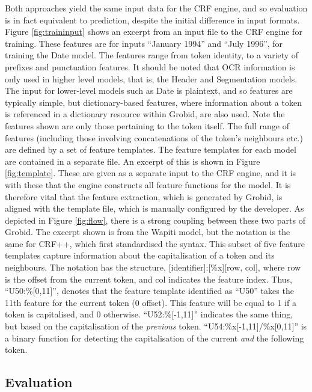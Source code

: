 Both approaches yield the same input data for the CRF engine, and so evaluation is in fact equivalent to prediction, despite the initial difference in input formats. Figure \ref{fig:traininput} shows an excerpt from an input file to the CRF engine for training. These features are for inputs ``January 1994'' and ``July 1996'', for training the Date model. The features range from token identity, to a variety of prefixes and punctuation features. It should be noted that OCR information is only used in higher level models, that is, the Header and Segmentation models. The input for lower-level models such as Date is plaintext, and so features are typically simple, but dictionary-based features, where information about a token is referenced in a dictionary resource within Grobid, are also used. Note the features shown are only those pertaining to the token itself. The full range of features (including those involving concatenations of the token's neighbours etc.) are defined by a set of feature templates. The feature templates for each model are contained in a separate file. An excerpt of this is shown in Figure \ref{fig:template}. These are given as a separate input to the CRF engine, and it is with these that the engine constructs all feature functions for the model. It is therefore vital that the feature extraction, which is generated by Grobid, is aligned with the template file, which is manually configured by the developer. As depicted in Figure \ref{fig:flow}, there is a strong coupling between these two parts of Grobid. The excerpt shown is from the Wapiti model, but the notation is the same for CRF++, which first standardised the syntax. This subset of five feature templates capture information about the capitalisation of a token and its neighbours. The notation has the structure, [identifier]:[\%x][row, col], where row is the offset from the current token, and col indicates the feature index. Thus, ``U50:\%[0,11]'', denotes that the feature template identified as ``U50'' takes the 11th feature for the current token (0 offset). This feature will be equal to 1 if a token is capitalised, and 0 otherwise. ``U52:\%[-1,11]'' indicates the same thing, but based on the capitalisation of the \emph{previous} token. ``U54:\%x[-1,11]/\%x[0,11]'' is a binary function for detecting the capitalisation of the current \emph{and} the following token.

\subsection{Evaluation}

